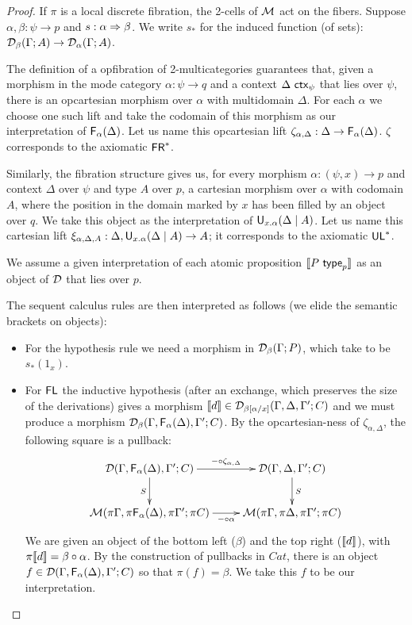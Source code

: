 \begin{proof}
If $\pi$ is a local discrete fibration, the 2-cells of $\mathcal{M}$ act on the
fibers. Suppose $\alpha, \beta : \psi \to p$ and $s : \alpha \Rightarrow
\beta$. We write $s_*$ for the induced function (of sets):
$\mathcal{D}_\beta(\Gamma; A) \to \mathcal{D}_\alpha(\Gamma; A)$.  

The definition of a opfibration of 2-multicategories guarantees that,
given a morphism in the mode category $\alpha : \psi \to q$ and a
context $\Delta \,\, \mathsf{ctx}_{\psi}$ that lies over $\psi$, there is an
opcartesian morphism over $\alpha$ with multidomain $\Delta$. For each
$\alpha$ we choose one such lift and take the codomain of this morphism
as our interpretation of $\mathsf{F}_{\alpha}(\Delta)$. Let us name this
opcartesian lift $\zeta_{\alpha, \Delta} : \Delta \to
\mathsf{F}_{\alpha}(\Delta)$. $\zeta$ corresponds to the axiomatic $\mathsf{FR}^*$.

Similarly, the fibration structure gives us, for every morphism $\alpha
: (\psi,x) \to p$ and context $\Delta$ over $\psi$ and type $A$ over
$p$, a cartesian morphism over $\alpha$ with codomain $A$, where the
position in the domain marked by $x$ has been filled by an object over
$q$. We take this object as the interpretation of
$\mathsf{U}_{x.\alpha}(\Delta \mid A)$.  Let us name this cartesian lift
$\xi_{\alpha, \Delta,A} : \Delta,\mathsf{U}_{x.\alpha}(\Delta \mid A) \to A$; it
corresponds to the axiomatic $\mathsf{UL}^*$.  

We assume a given interpretation of each atomic proposition $\llbracket
P \,\, \mathsf{type}_{p} \rrbracket$ as an object of $\mathcal{D}$ that lies over $p$.

The sequent calculus rules are then interpreted as follows (we elide the
semantic brackets on objects):

\begin{itemize}
\item For the hypothesis rule
we need a morphism in $\mathcal{D}_\beta(\Gamma; P)$, which take to be $s_*(1_x)$.
\item For $\mathsf{FL}$
the inductive hypothesis (after an exchange, which preserves the size of
the derivations) gives a morphism $\llbracket d \rrbracket \in \mathcal{D}_{\beta[\alpha/x]}(\Gamma, \Delta, \Gamma'; C)$ and we must produce a morphism
$\mathcal{D}_{\beta}(\Gamma, \mathsf{F}_{\alpha}(\Delta),\Gamma'; C)$. By the
opcartesian-ness of $\zeta_{\alpha, \Delta}$, the following square is a
pullback:
\[ \xymatrix{
    \cD(\Gamma,\F{\alpha}{\Delta},\Gamma';C) \ar[r]^-{-\circ \zeta_{\alpha, \Delta}} \ar[d]_S &
    \cD(\Gamma,\Delta,\Gamma';C) \ar[d]^S \\
    \M(\pi\Gamma,\pi \F{\alpha}{\Delta}, \pi\Gamma'; \pi C) \ar[r]_-{-\circ \alpha} &
    \M(\pi\Gamma,\pi\Delta,\pi\Gamma'; \pi C)
}\]
We are given an object of the bottom left ($\beta$) and the top right
($\llbracket d \rrbracket$), with $\pi\llbracket d \rrbracket = \beta \circ \alpha$. By the
construction of pullbacks in $Cat$, there is an object $f \in
\mathcal{D}(\Gamma,\mathsf{F}_{\alpha}(\Delta),\Gamma';C)$ so that $\pi(f) = \beta$. We take
this $f$ to be our interpretation.


\end{itemize}
\end{proof}
